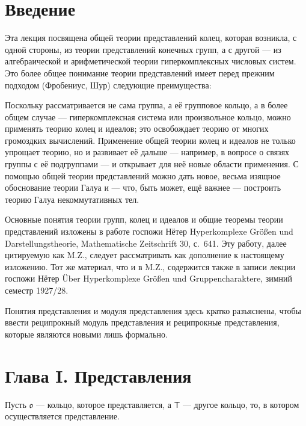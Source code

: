 \documentclass[11pt]{article}
\newcommand{\foreign}[1]{#1}
\begin{document}
\clearpage
\section*{Введение}\label{einleitung}

Эта лекция посвящена общей теории представлений колец, которая
возникла, с одной стороны, из теории представлений конечных групп, а
с другой --- из алгебраической и арифметической теории
гиперкомплексных числовых систем. Это более общее понимание теории
представлений имеет перед прежним подходом (Фробениус, Шур) следующие
преимущества:

Поскольку рассматривается не сама группа, а её групповое кольцо, а
в более общем случае --- гиперкомплексная система или произвольное
кольцо, можно применять теорию колец и идеалов; это освобождает теорию
от многих громоздких вычислений. Применение общей теории колец и
идеалов не только упрощает теорию, но и развивает её дальше ---
например, в вопросе о связях группы с её подгруппами --- и открывает
для неё новые области применения. С помощью общей теории
представлений можно дать новое, весьма изящное обоснование теории
Галуа и --- что, быть может, ещё важнее --- построить теорию Галуа
некоммутативных тел.

Основные понятия теории групп, колец и идеалов и общие теоремы теории
представлений изложены в работе госпожи Нётер
\foreign{Hyperkomplexe Größen und Darstellungstheorie},
\foreign{Mathematische Zeitschrift} 30, с.~641. Эту работу, далее
цитируемую как M.Z., следует рассматривать как дополнение к настоящему
изложению. Тот же материал, что и в M.Z., содержится также в записи
лекции госпожи Нётер
\foreign{Über Hyperkomplexe Größen und Gruppencharaktere}, зимний
семестр 1927/28.

Понятия представления и модуля представления здесь кратко разъяснены,
чтобы ввести реципрокный модуль представления и реципрокные
представления, которые являются новыми лишь формально.

\section*{Глава I. Представления}\label{kapitel-i.-darstellungen}

Пусть $\mathfrak{o}$ --- кольцо, которое представляется, а $\mathsf T$
--- другое кольцо, то, в котором осуществляется представление.
\end{document}
